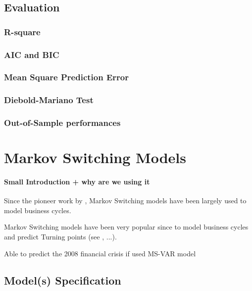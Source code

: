 \documentclass[12pt,a4paper,oneside]{book}
\begin{document}
\section{Evaluation}

\subsection{R-square}

\subsection{AIC and BIC}

\subsection{Mean Square Prediction Error}

\subsection{Diebold-Mariano Test}



\subsection{Out-of-Sample performances}




\chapter{Markov Switching Models}



\subsubsection{Small Introduction + why are we using it}

Since the pioneer work by \cite{hamilton_new_1989}, Markov Switching models have been largely used to model business cycles.


Markov Switching models have been very popular since \cite{hamilton_new_1989} to model business cycles and predict Turning points (see \cite{duprey_how_2017}, ...).

Able to predict the 2008 financial crisis if used MS-VAR model \cite{gadea_rivas_failure_2015}




\section{Model(s) Specification}
\end{document}

